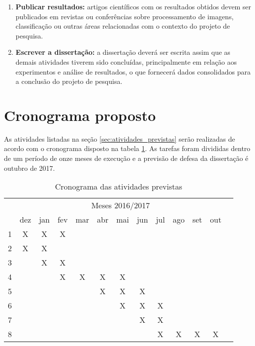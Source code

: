 \begin{enumerate}
    \item \textbf{Publicar resultados:} artigos científicos com os resultados obtidos devem ser publicados em revistas ou conferências sobre processamento de imagens, classificação ou outras áreas relacionadas com o contexto do projeto de pesquisa.

    \item \textbf{Escrever a dissertação:} a dissertação deverá ser escrita assim que as demais atividades tiverem sido concluídas, principalmente em relação aos experimentos e análise de resultados, o que fornecerá dados consolidados para a conclusão do projeto de pesquisa.
\end{enumerate}

\section{Cronograma proposto}
\label{sec:cronograma}
As atividades listadas na seção \ref{sec:atividades_previstas} serão realizadas de acordo com o cronograma disposto na tabela \ref{tab:cronograma_proposto}. As tarefas foram divididas dentro de um período de onze meses de execução e a previsão de defesa da dissertação é outubro de 2017.

\begin{table}[!htpb]
\centering
\begin{small} 
  
\setlength{\tabcolsep}{6pt} 

\begin{tabular}{|c|c|c|c|c|c|c|c|c|c|c|c|c|}\hline
 & \multicolumn{11}{c|}{Meses 2016/2017}\\ \cline{2-12}
\raisebox{1.5ex}{Atividade} & dez & jan & fev & mar & abr & mai & jun & jul & ago & set & out \\ \hline

1 & X & X & X &   &   &   &   &   &   &   & \\ \hline
2 & X & X &   &   &   &   &   &   &   &   & \\ \hline
3 &   & X & X &   &   &   &   &   &   &   & \\ \hline
4 &   &   & X & X & X & X &   &   &   &   & \\ \hline
5 &   &   &   &   & X & X & X &   &   &   & \\ \hline
6 &   &   &   &   &   & X & X & X &   &   & \\ \hline
7 &   &   &   &   &   &   & X & X &   &   & \\ \hline
8 &   &   &   &   &   &   &   & X & X & X & X \\ \hline

\end{tabular} 
\end{small}
\caption{Cronograma das atividades previstas}
\label{tab:cronograma_proposto}
\end{table}
